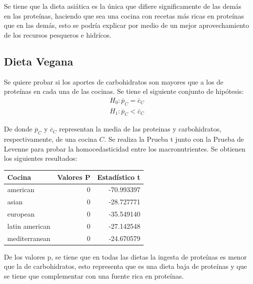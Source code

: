 \documentclass[12pt,a4paper]{article}
\begin{document}
{{            Se tiene que la dieta asiática es la única que difiere significamente 
            de las demás en las proteínas, haciendo que sea una cocina con recetas 
            más ricas en proteínas que en las demás, esto se podría explicar por 
            medio de un mejor aprovechamiento de los recursos pesqueros e hidrícos.
        }

        \subsection{Dieta Vegana}
        {
            Se quiere probar si los aportes de carbohidratos son mayores 
            que a los de proteínas en cada una de las cocinas. Se tiene el 
            siguiente conjunto de hipótesis:
            \begin{align*}
                H_0 : \overline{p}_C = \overline{c}_C \\
                H_1 : \overline{p}_C < \overline{c}_C
            \end{align*}

            De donde $\overline{p}_C$ y $\overline{c}_C$ representan la media 
            de las proteinas y carbohidratos, respectivamente, de una cocina $C$. 
            Se realiza la Prueba t junto con la Prueba de Levenne para 
            probar la homocedasticidad entre los macronutrientes. Se obtienen 
            los siguientes resultados:

            \begin{center}
                \begin{tabular}{lrr}
                \toprule
                    Cocina & Valores P & Estadístico t \\
                \midrule
                    american       & 0 & -70.993397 \\
                    asian          & 0 & -28.727771 \\
                    european       & 0 & -35.549140 \\
                    latin american & 0 & -27.142548 \\
                    mediterranean  & 0 & -24.670579 \\
                \bottomrule
                \end{tabular}
            \end{center}

            De los valores p, se tiene que en todas las dietas la ingesta de 
            proteínas es menor que la de carbohidratos, esto representa que 
            es una dieta baja de proteínas y que se tiene que complementar 
            con una fuente rica en proteínas.
        }

}
\end{document}
